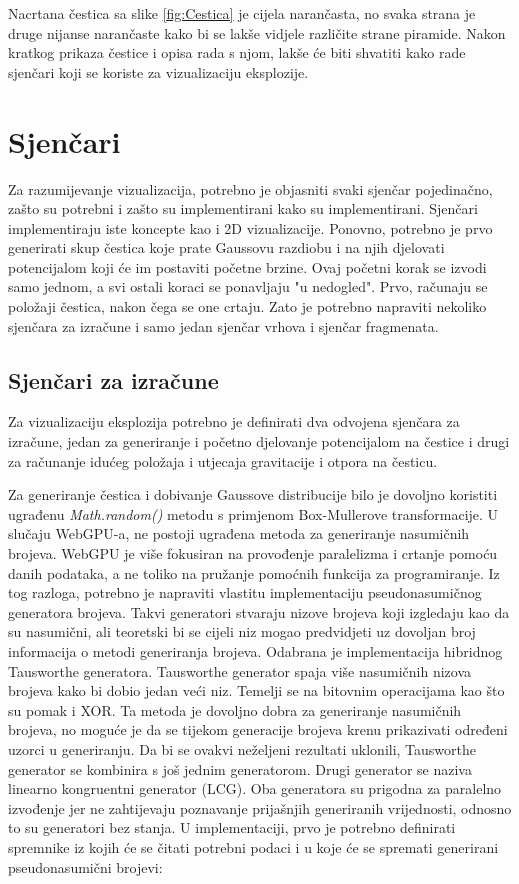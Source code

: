 \documentclass{foi}
\begin{document}
Nacrtana čestica sa slike \ref{fig:Cestica} je cijela narančasta, no svaka strana je druge nijanse narančaste kako bi se lakše vidjele različite strane piramide. Nakon kratkog prikaza čestice i opisa rada s njom, lakše će biti shvatiti kako rade sjenčari koji se koriste za vizualizaciju eksplozije.

\section{Sjenčari}
Za razumijevanje vizualizacija, potrebno je objasniti svaki sjenčar pojedinačno, zašto su potrebni i zašto su implementirani kako su implementirani. Sjenčari implementiraju iste koncepte kao i 2D vizualizacije. Ponovno, potrebno je prvo generirati skup čestica koje prate Gaussovu razdiobu i na njih djelovati potencijalom koji će im postaviti početne brzine. Ovaj početni korak se izvodi samo jednom, a svi ostali koraci se ponavljaju "u nedogled". Prvo, računaju se položaji čestica, nakon čega se one crtaju. Zato je potrebno napraviti nekoliko sjenčara za izračune i samo jedan sjenčar vrhova i sjenčar fragmenata.

\subsection{Sjenčari za izračune}
Za vizualizaciju eksplozija potrebno je definirati dva odvojena sjenčara za izračune, jedan za generiranje i početno djelovanje potencijalom na čestice i drugi za računanje idućeg položaja i utjecaja gravitacije i otpora na česticu. 

Za generiranje čestica i dobivanje Gaussove distribucije bilo je dovoljno koristiti ugrađenu \textit{Math.random()} metodu s primjenom Box-Mullerove transformacije. U slučaju WebGPU-a, ne postoji ugrađena metoda za generiranje nasumičnih brojeva. WebGPU je više fokusiran na provođenje paralelizma i crtanje pomoću danih podataka, a ne toliko na pružanje pomoćnih funkcija za programiranje. Iz tog razloga, potrebno je napraviti vlastitu implementaciju pseudonasumičnog generatora brojeva. Takvi generatori stvaraju nizove brojeva koji izgledaju kao da su nasumični, ali teoretski bi se cijeli niz mogao predvidjeti uz dovoljan broj informacija o metodi generiranja brojeva. Odabrana je implementacija hibridnog Tausworthe generatora. Tausworthe generator spaja više nasumičnih nizova brojeva kako bi dobio jedan veći niz. Temelji se na bitovnim operacijama kao što su pomak i XOR. Ta metoda je dovoljno dobra za generiranje nasumičnih brojeva, no moguće je da se tijekom generacije brojeva krenu prikazivati određeni uzorci u generiranju. Da bi se ovakvi neželjeni rezultati uklonili, Tausworthe generator se kombinira s još jednim generatorom. Drugi generator se naziva linearno kongruentni generator (LCG). Oba generatora su prigodna za paralelno izvođenje jer ne zahtijevaju poznavanje prijašnjih generiranih vrijednosti, odnosno to su generatori bez stanja. U implementaciji, prvo je potrebno definirati spremnike iz kojih će se čitati potrebni podaci i u koje će se spremati generirani pseudonasumični brojevi:
\end{document}
